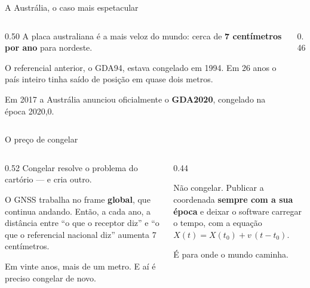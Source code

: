 \documentclass[aspectratio=169,11pt]{beamer}
\newcommand{\bnum}[1]{\textbf{\textcolor{mTeal}{#1}}}
\begin{document}
\begin{frame}{A Austrália, o caso mais espetacular}
  \begin{columns}[T]
    \begin{column}{0.50\textwidth}
      A placa australiana é a mais veloz do mundo: cerca de \bnum{7 centímetros por ano}
      para nordeste.
      \medskip

      O referencial anterior, o GDA94, estava congelado em 1994. Em 26 anos o país inteiro
      tinha saído de posição em quase \alert{dois metros}.
      \medskip

      Em 2017 a Austrália anunciou oficialmente o \bnum{GDA2020}, congelado na época
      2020,0.
    \end{column}
    \begin{column}{0.46\textwidth}
      \centering
    \end{column}
  \end{columns}
\end{frame}

\begin{frame}{O preço de congelar}
  \begin{columns}[c]
    \begin{column}{0.52\textwidth}
      Congelar resolve o problema do cartório --- e cria outro.
      \medskip

      O GNSS trabalha no frame \bnum{global}, que continua andando. Então, a cada ano, a
      distância entre ``o que o receptor diz'' e ``o que o referencial nacional diz''
      \alert{aumenta 7 centímetros}.
      \medskip

      Em vinte anos, mais de um metro. E aí é preciso congelar de novo.
    \end{column}
    \begin{column}{0.44\textwidth}
      \begin{ideia}[title={A saída moderna}]
        Não congelar. Publicar a coordenada \bnum{sempre com a sua época} e deixar o
        software carregar o tempo, com a equação
        $X(t) = X(t_0) + v\,(t-t_0)$.
        \medskip

        É para onde o mundo caminha.
      \end{ideia}
    \end{column}
  \end{columns}
\end{frame}
\end{document}
